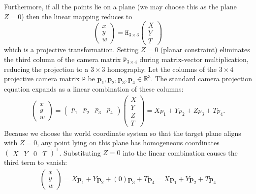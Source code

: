 \documentclass{report}
\begin{document}
\begin{itemize}
            \bigbreak \noindent 
            Furthermore, if all the points lie on a plane (we may choose this as the plane $Z = 0$) then the linear mapping reduces to
            \[\begin{pmatrix}x\\y\\w\end{pmatrix}=\mathtt{H}_{3\times 3}\begin{pmatrix} X \\ Y \\ T \end{pmatrix}\]
            which is a projective transformation.
            \bigbreak \noindent 
            Setting \(Z = 0\) (planar constraint) eliminates the third column of the camera matrix \(\mathtt{P}_{3\times 4}\) during matrix-vector multiplication, reducing the projection to a \(3 \times 3\) homography.
            \bigbreak \noindent 
            Let the columns of the \(3 \times 4\) projective camera matrix \(\mathtt{P}\) be \(\mathbf{p}_1, \mathbf{p}_2, \mathbf{p}_3, \mathbf{p}_4 \in \mathbb{R}^3\). The standard camera projection equation expands as a linear combination of these columns:
            \begin{align*}
                \begin{pmatrix} x \\ y \\ w \end{pmatrix} = \begin{pmatrix} p_{1} & p_{2} & p_{3} & p_{4} \end{pmatrix}\begin{pmatrix} X \\ Y \\ Z \\ T  \end{pmatrix} = Xp_{1} + Yp_{2} + Zp_{3} + Tp_{4}
            .\end{align*}
            Because we choose the world coordinate system so that the target plane aligns with \(Z = 0\), any point lying on this plane has homogeneous coordinates \(\left(\begin{matrix}X&Y&0&T\end{matrix}\right)^{\top }\).
            \bigbreak \noindent 
            Substituting \(Z = 0\) into the linear combination causes the third term to vanish:
            \begin{align*}
                \left(\begin{matrix}x\\ y\\ w\end{matrix}\right)=X\mathbf{p}_{1}+Y\mathbf{p}_{2}+(0)\mathbf{p}_{3}+T\mathbf{p}_{4}=X\mathbf{p}_{1}+Y\mathbf{p}_{2}+T\mathbf{p}_{4}

\end{align*}
\end{itemize}
\end{document}
